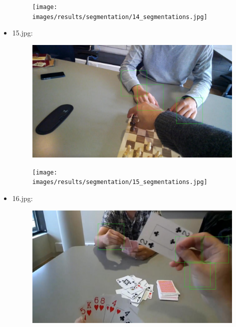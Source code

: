 \begin{itemize}
\begin{figure}[!htb]
\begin{minipage}{0.5\textwidth}
            \end{minipage}\hfill
            \begin{minipage}{0.5\textwidth}
                \centering
                \texttt{[image: images/results/segmentation/14\_segmentations.jpg]}
            \end{minipage}
        \end{figure}
    \newpage
    \item 15.jpg:
        \begin{figure}[!htb]
            \begin{minipage}{0.5\textwidth}
                \centering
                \includegraphics[scale = 0.205]{images/results/detection/15_detections.jpg}
            \end{minipage}\hfill
            \begin{minipage}{0.5\textwidth}
                \centering
                \texttt{[image: images/results/segmentation/15\_segmentations.jpg]}
            \end{minipage}
        \end{figure}
    \item 16.jpg:
        \begin{figure}[!htb]
            \begin{minipage}{0.5\textwidth}
                \centering
                \includegraphics[scale = 0.205]{images/results/detection/16_detections.jpg}

\end{minipage}
\end{figure}
\end{itemize}
